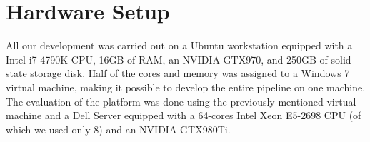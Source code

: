 
\section{Hardware Setup}

All our development was carried out on a Ubuntu workstation equipped with a
Intel i7-4790K CPU, 16GB of RAM, an NVIDIA GTX970, and 250GB of solid state
storage disk. Half of the cores and memory was assigned to a Windows 7 virtual
machine, making it possible to develop the entire pipeline on one machine. The
evaluation of the platform was done using the previously mentioned virtual
machine and a Dell Server equipped with a 64-cores Intel Xeon E5-2698 CPU (of
which we used only 8) and an NVIDIA GTX980Ti.
